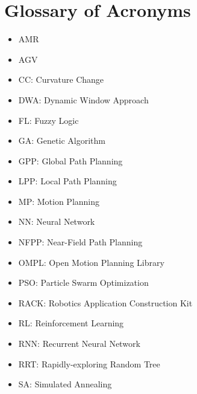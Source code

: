 \chapter*{Glossary of Acronyms}


\begin{itemize}
        \item AMR
        \item AGV
        \item CC: Curvature Change
        \item DWA: Dynamic Window Approach
        \item FL: Fuzzy Logic
        \item GA: Genetic Algorithm
        \item GPP: Global Path Planning
        \item LPP: Local Path Planning
        \item MP: Motion Planning
        \item NN: Neural Network
        \item NFPP: Near-Field Path Planning
        \item OMPL: Open Motion Planning Library
        \item PSO: Particle Swarm Optimization
        \item RACK: Robotics Application Construction Kit
        \item RL: Reinforcement Learning
        \item RNN: Recurrent Neural Network
        \item RRT: Rapidly-exploring Random Tree
        \item SA: Simulated Annealing
\end{itemize}

\newpage







